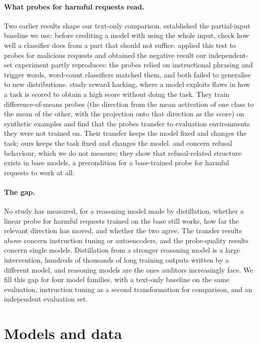 \documentclass[10pt]{article}
\begin{document}
\paragraph{What probes for harmful requests read.} Two earlier results shape our text-only comparison. \citet{gururangan2018} established the partial-input baseline we use: before crediting a model with using the whole input, check how well a classifier does from a part that should not suffice. \citet{wang2025} applied this test to probes for malicious requests and obtained the negative result our independent-set experiment partly reproduces: the probes relied on instructional phrasing and trigger words, word-count classifiers matched them, and both failed to generalise to new distributions. \citet{bergen2026} study reward hacking, where a model exploits flaws in how a task is scored to obtain a high score without doing the task. They train difference-of-means probes (the direction from the mean activation of one class to the mean of the other, with the projection onto that direction as the score) on synthetic examples and find that the probes transfer to evaluation environments they were not trained on. Their transfer keeps the model fixed and changes the task; ours keeps the task fixed and changes the model. \citet{arditi2024} and \citet{kissane2024b} concern refusal behaviour, which we do not measure; they show that refusal-related structure exists in base models, a precondition for a base-trained probe for harmful requests to work at all.

\paragraph{The gap.} No study has measured, for a reasoning model made by distillation, whether a linear probe for harmful requests trained on the base still works, how far the relevant direction has moved, and whether the two agree. The transfer results above concern instruction tuning or autoencoders, and the probe-quality results concern single models. Distillation from a stronger reasoning model is a large intervention, hundreds of thousands of long training outputs written by a different model, and reasoning models are the ones auditors increasingly face. We fill this gap for four model families, with a text-only baseline on the same evaluation, instruction tuning as a second transformation for comparison, and an independent evaluation set.

\section{Models and data}
\label{sec:setup}
\end{document}
